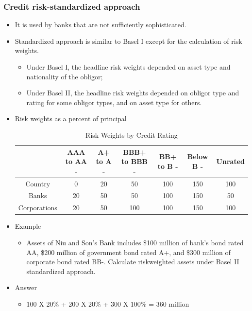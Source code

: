 \subsubsection{Credit risk-standardized approach}
\begin{itemize}
\item It is used by banks that are not sufficiently sophisticated.
\item Standardized approach is similar to Basel I except for the calculation of risk weights.
    \begin{itemize}
    \item Under Basel I, the headline risk weights depended on asset type and nationality of the obligor;
    \item Under Basel II, the headline risk weights depended on obligor type and rating for some obligor types, and on asset type for others.
    \end{itemize}
\item Risk weights as a percent of principal

\begin{table}[h]
    \centering
    \caption{Risk Weights by Credit Rating}
    \renewcommand{\arraystretch}{1.5} %
    \begin{tabular}{|c|c|c|c|c|c|c|}
        \hline
        \textbf{ } & \textbf{AAA to AA -} & \textbf{A+ to A -} & \textbf{BBB+ to BBB -} & \textbf{BB+ to B -} & \textbf{Below B -} & \textbf{Unrated} \\
        \hline
        Country & 0 & 20 & 50 & 100 & 150 & 100 \\
        \hline
        Banks & 20 & 50 & 50 & 100 & 150 & 50 \\
        \hline
        Corporations & 20 & 50 & 100 & 100 & 150 & 100 \\
        \hline
    \end{tabular}
\end{table}

\item Example
    \begin{itemize}
    \item Assets of Niu and Son's Bank includes \$100 million of bank's bond rated AA, \$200 million of government bond rated A+, and \$300 million of corporate bond rated BB-. Calculate riskweighted assets under Basel II standardized approach.
    \end{itemize}
    
\item Answer
    \begin{itemize}
    \item 100 X 20\% + 200 X 20\% + 300 X 100\% = 360 million
    \end{itemize}
    
\end{itemize}


